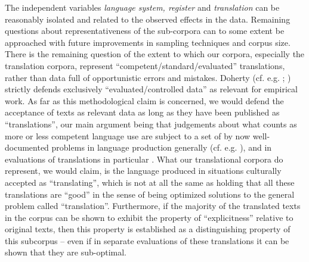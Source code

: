 \documentclass[output=paper]{LSP/langsci}
\begin{document}
The independent variables \textit{language system, register }and\textit{ translation} can be reasonably isolated and related to the observed effects in the data. Remaining questions about representativeness of the sub-corpora can to some extent be approached with future improvements in sampling techniques and corpus size. There is the remaining question of the extent to which our corpora, especially the translation corpora, represent ``competent/standard/evaluated'' translations, rather than data full of opportunistic errors and mistakes. Doherty (cf. e.g. \citeyear[11ff]{Doherty2002}; \citeyear[1ff and 159ff]{Doherty2006}) strictly defends exclusively ``evaluated/controlled data'' as relevant for empirical work. As far as this methodological claim is concerned, we would defend the acceptance of texts as relevant data as long as they have been published as ``translations'', our main argument being that judgements about what counts as more or less competent language use are subject to a set of by now well-documented problems in language production generally (cf. e.g. \citealt{Haider2009}), and in evaluations of translations in particular \citep{House2001}. What our translational corpora do represent, we would claim, is the language produced in situations culturally accepted as ``translating'', which is not at all the same as holding that all these translations are ``good'' in the sense of being optimized solutions to the general problem called ``translation''. Furthermore, if the majority of the translated texts in the corpus can be shown to exhibit the property of ``explicitness'' relative to original texts, then this property is established as a distinguishing property of this subcorpus -- even if in separate evaluations of these translations it can be shown that they are sub-optimal.
\end{document}
